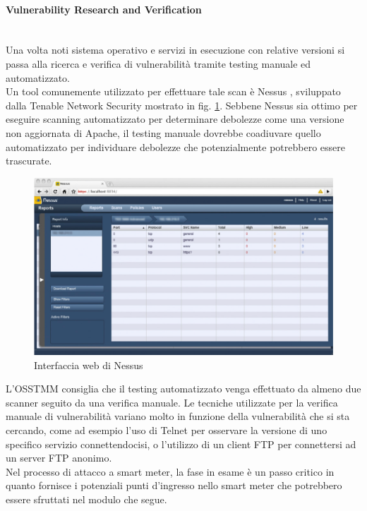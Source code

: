 \paragraph{Vulnerability Research and Verification}\mbox{}\\
Una volta noti sistema operativo e servizi in esecuzione con relative versioni si passa alla ricerca  e verifica di vulnerabilità tramite testing manuale ed automatizzato.\\
Un tool comunemente utilizzato per effettuare tale scan è Nessus \cite{nessus}, sviluppato dalla Tenable Network Security mostrato in fig. \ref{nessus_img}. Sebbene Nessus sia ottimo per eseguire scanning automatizzato per determinare debolezze come una versione non aggiornata di Apache, il testing manuale dovrebbe coadiuvare quello automatizzato per individuare debolezze che potenzialmente potrebbero essere trascurate.\\
\begin{figure}[hbtp]
	\centering
	\includegraphics[scale=.3]{imgs/attack/nessus.png}
	\caption{Interfaccia web di Nessus}
	\label{nessus_img}
\end{figure}
L'OSSTMM consiglia che il testing automatizzato venga effettuato da almeno due scanner seguito da una verifica manuale. Le tecniche utilizzate per la verifica manuale di vulnerabilità variano molto in funzione della vulnerabilità che si sta cercando, come ad esempio l'uso di Telnet per osservare la versione di uno specifico servizio connettendocisi, o l'utilizzo di un client FTP per connettersi ad un server FTP anonimo.\\
Nel processo di attacco a smart meter, la fase in esame è un passo critico in quanto fornisce i potenziali punti d'ingresso nello smart meter che potrebbero essere sfruttati nel modulo che segue.

